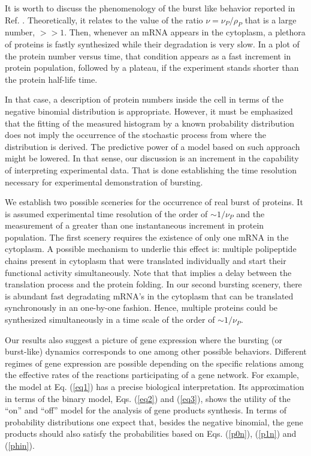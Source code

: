 It is worth to discuss the phenomenology of the burst like behavior
reported in Ref. \cite{cai06}. Theoretically, it relates to the value
of the ratio $\nu = \nu_P/\rho_P$ that is a large number, $>>
1$. Then, whenever an mRNA appears in the cytoplasm, a plethora of
proteins is fastly synthesized while their degradation is very slow.
In a plot of the protein number versus time, that condition appears as
a fast increment in protein population, followed by a plateau, if the
experiment stands shorter than the protein half-life time.

In that case, a description of protein numbers inside the cell in
terms of the negative binomial distribution is appropriate. However,
it must be emphasized that the fitting of the measured histogram by a
known probability distribution does not imply the occurrence of the
stochastic process from where the distribution is derived. The
predictive power of a model based on such approach might be lowered.
In that sense, our discussion is an increment in the capability of
interpreting experimental data. That is done establishing the time
resolution necessary for experimental demonstration of bursting.

We establish two possible sceneries for the occurrence of real burst of
proteins. It is assumed experimental time resolution of the order of
$\sim 1/\nu_P$ and the measurement of a greater than one instantaneous
increment in protein population. The first scenery requires the
existence of only one mRNA in the cytoplasm. A possible mechanism to
underlie this effect is: multiple polipeptide chains present in
cytoplasm that were translated individually and start their functional
activity simultaneously. Note that that implies a delay between the
translation process and the protein folding. In our second bursting
scenery, there is abundant fast degradating mRNA's in the cytoplasm
that can be translated synchronously in an one-by-one fashion. Hence,
multiple proteins could be synthesized simultaneously in a time scale
of the order of $\sim 1/\nu_P$.

Our results also suggest a picture of gene expression where the
bursting (or burst-like) dynamics corresponds to one among other
possible behaviors. Different regimes of gene expression are possible
depending on the specific relations among the effective rates of the
reactions participating of a gene network. For example, the model at
Eq. (\ref{eq1}) has a precise biological interpretation. Its
approximation in terms of the binary model, Eqs. (\ref{eq2}) and
(\ref{eq3}), shows the utility of the ``on'' and ``off'' model for the
analysis of gene products synthesis. In terms of probability
distributions one expect that, besides the negative binomial,
the gene products should also satisfy the probabilities
based on Eqs. (\ref{p0n}), (\ref{p1n}) and (\ref{phin}). 

